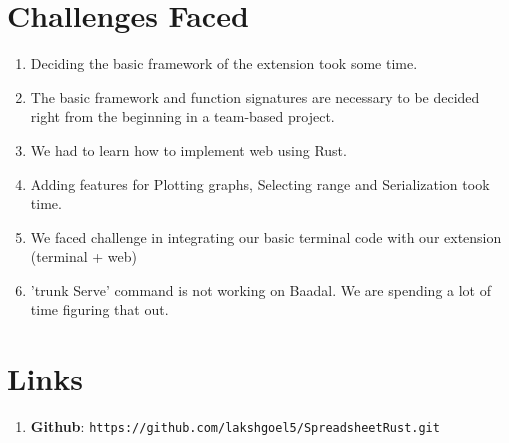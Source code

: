 \documentclass{article}
\begin{document}
\section{Challenges Faced}
\begin{enumerate}
    \item Deciding the basic framework of the extension took some time.
    \item The basic framework and function signatures are necessary to be decided right from the beginning in a team-based project.
    \item We had to learn how to implement web using Rust.
    \item Adding features for Plotting graphs, Selecting range and Serialization took time.
    \item We faced challenge in integrating our basic terminal code with our extension (terminal + web)
    \item 'trunk Serve' command is not working on Baadal. We are spending a lot of time figuring that out.
\end{enumerate}


\section{Links}
\begin{enumerate}
    \item \textbf{Github}: \texttt{https://github.com/lakshgoel5/SpreadsheetRust.git}
\end{enumerate}
\end{document}
